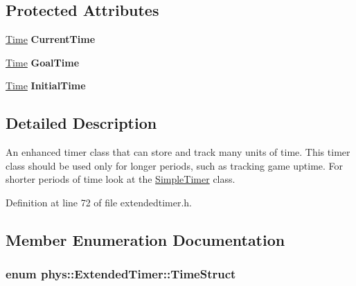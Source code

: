 \subsection*{Protected Attributes}
\begin{DoxyCompactItemize}
\item 
\hypertarget{classphys_1_1ExtendedTimer_aa71c8250d0a9953b00e25391c8e6d910}{
\hyperlink{structphys_1_1Time}{Time} {\bfseries CurrentTime}}
\label{dc/d7c/classphys_1_1ExtendedTimer_aa71c8250d0a9953b00e25391c8e6d910}

\item 
\hypertarget{classphys_1_1ExtendedTimer_a6dd2ddfeaf989e2c70dc8afd399d8ca8}{
\hyperlink{structphys_1_1Time}{Time} {\bfseries GoalTime}}
\label{dc/d7c/classphys_1_1ExtendedTimer_a6dd2ddfeaf989e2c70dc8afd399d8ca8}

\item 
\hypertarget{classphys_1_1ExtendedTimer_a231bf60b0b65a41095b6a4c140596531}{
\hyperlink{structphys_1_1Time}{Time} {\bfseries InitialTime}}
\label{dc/d7c/classphys_1_1ExtendedTimer_a231bf60b0b65a41095b6a4c140596531}

\end{DoxyCompactItemize}


\subsection{Detailed Description}
An enhanced timer class that can store and track many units of time. This timer class should be used only for longer periods, such as tracking game uptime. For shorter periods of time look at the \hyperlink{classphys_1_1SimpleTimer}{SimpleTimer} class. 

Definition at line 72 of file extendedtimer.h.



\subsection{Member Enumeration Documentation}
\hypertarget{classphys_1_1ExtendedTimer_a0f316e9347d1c118a157cc3c737c554b}{
\subsubsection[{TimeStruct}]{\setlength{\rightskip}{0pt plus 5cm}enum {\bf phys::ExtendedTimer::TimeStruct}}}
\label{dc/d7c/classphys_1_1ExtendedTimer_a0f316e9347d1c118a157cc3c737c554b}


